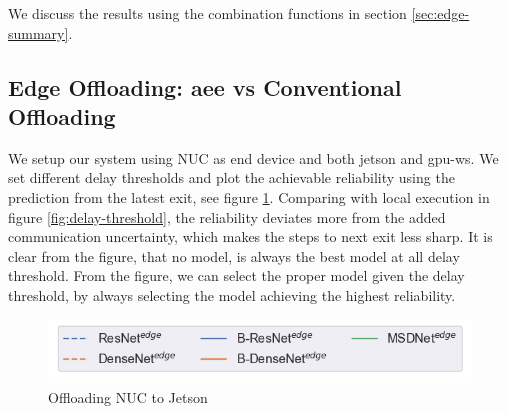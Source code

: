 We discuss the results using the combination functions in section \ref{sec:edge-summary}. 

\subsection{Edge Offloading: \gls{aee} vs Conventional Offloading}

We setup our system using NUC as end device and both \gls{jetson} and \gls{gpu-ws}. We set different delay thresholds and plot the achievable reliability using the prediction from the latest exit, see figure \ref{fig:practical-offloading}. Comparing with local execution in figure \ref{fig:delay-threshold}, the reliability deviates more from the added communication uncertainty, which makes the steps to next exit less sharp. It is clear from the figure, that no model, is always the best model at all delay threshold. From the figure, we can select the proper model given the delay threshold, by always selecting the model achieving the highest reliability.
\begin{figure}
	\captionsetup[subfigure]{justification=centering,farskip=1pt,captionskip=1pt}
	\centering
	\includegraphics[width=.5\linewidth]{figures/edge/offloading_legend}
	\hfill
	\caption[Offloading NUC to Jetson]{Offloading NUC to Jetson}
	\label{fig:practical-offloading}
\end{figure}

